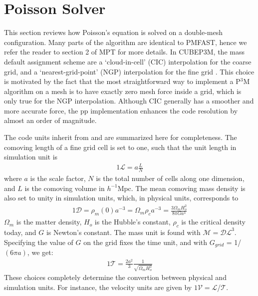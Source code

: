 \documentclass[useAMS,usenatbib]{mn2e}
\begin{document}
\section{Poisson Solver}
\label{sec:Poisson}


This section reviews how Poisson's equation is solved on a double-mesh configuration. 
Many parts of the algorithm are identical to {\small PMFAST}, hence we refer the reader 
to section 2 of MPT for more details. In {\small CUBEP3M}, the mass default assignment scheme are
a `cloud-in-cell' (CIC) interpolation for the coarse grid,  and a `nearest-grid-point' (NGP) interpolation 
for the fine grid \citep{1981csup.book.....H}. This choice is motivated by the fact that the most straightforward 
way to implement a P$^3$M algorithm on a mesh is to have exactly zero mesh force inside a grid, 
which is only true for the NGP interpolation. Although CIC generally has a smoother and more accurate force,
the pp implementation enhances the code resolution by almost an order of magnitude. 

The code units inherit from \citep{2004NewA....9..443T} and are summarized here for completeness.
The comoving length of a fine grid cell is set to one,
such that the unit length in simulation unit is 
\begin{eqnarray}
1\mathcal{L} = a \frac{L}{N} 
\end{eqnarray}
where $a$ is the scale factor, $N$ is the total number of cells along one dimension,
and $L$ is the comoving volume in $h^{-1}\mbox{Mpc}$.
The mean comoving mass density is also set to unity in simulation units, 
which, in physical units, corresponds to 
\begin{eqnarray}
1\mathcal{D} = \rho_{m}(0) a^{-3} = \Omega_{m} \rho_{c} a^{-3} = \frac{3 \Omega_{m} H_{o}^{2}}{8 \pi G a^{3} }
\end{eqnarray}
$\Omega_{m}$ is the matter density, $H_{o}$ is the Hubble's constant, $\rho_{c}$ is the critical density today,
and $G$ is Newton's constant. The mass unit is found with $\mathcal{M} = \mathcal{DL}^{3}$.
Specifying the value of $G$ on the grid fixes the time unit, and with $G_{grid}$ = 1/$(6 \pi a)$,
we get:
\begin{eqnarray}
1 \mathcal{T} = \frac{2a^{2}}{3}\frac{1}{\sqrt{\Omega_{m}H_{o}^{2}}}
\end{eqnarray}
These choices completely determine the convertion between physical and simulation units.
For instance, the velocity units are given by $1\mathcal{V} = \mathcal{L}$/$\mathcal{T}$.
\end{document}
